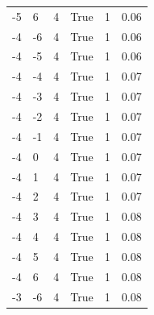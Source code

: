 \documentclass[10pt]{article}
\begin{document}
{\begin{longtable}{@{}llllll@{}}
-5 & 6 & 4 & True & 1 & 0.06 \\
-4 & -6 & 4 & True & 1 & 0.06 \\
-4 & -5 & 4 & True & 1 & 0.06 \\
-4 & -4 & 4 & True & 1 & 0.07 \\
-4 & -3 & 4 & True & 1 & 0.07 \\
-4 & -2 & 4 & True & 1 & 0.07 \\
-4 & -1 & 4 & True & 1 & 0.07 \\
-4 & 0 & 4 & True & 1 & 0.07 \\
-4 & 1 & 4 & True & 1 & 0.07 \\
-4 & 2 & 4 & True & 1 & 0.07 \\
-4 & 3 & 4 & True & 1 & 0.08 \\
-4 & 4 & 4 & True & 1 & 0.08 \\
-4 & 5 & 4 & True & 1 & 0.08 \\
-4 & 6 & 4 & True & 1 & 0.08 \\
-3 & -6 & 4 & True & 1 & 0.08 \\
\bottomrule
\end{longtable}}
\end{document}
